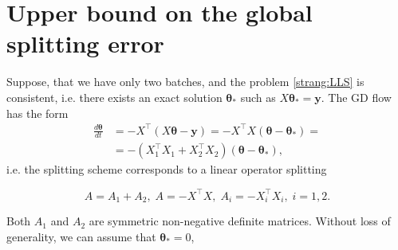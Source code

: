 \documentclass{article}
\newcommand{\vect}[1]{\boldsymbol{\mathbf{#1}}}
\begin{document}

\newpage
{ \small
}


\appendix


\section{Upper bound on the global splitting error}

Suppose, that we have only two batches, and the problem \eqref{strang:LLS} is consistent, i.e. there exists an exact solution $\vect{\theta}_*$ such as $X \vect{\theta}_* = \vect{y}$. The GD flow has the form
\begin{equation}\label{strang:model1}
\begin{split}
    \frac{d \vect{\theta}}{d t} &= -X^{\top} (X \vect{\theta} - \vect{y}) = -X^{\top} X(\vect{\theta} - \vect{\theta}_*) =\\ &= -(X_1^{\top} X_1 + X^{\top}_2 X_2)(\vect{\theta} - \vect{\theta}_*),
\end{split}
\end{equation}
i.e. the splitting scheme corresponds to a linear operator splitting

\begin{equation*}
A = A_1 + A_2, \; A = -X^{\top} X, \; A_i = -X^{\top}_i X_i, \; i = 1, 2.
\end{equation*}

Both $A_1$ and $A_2$ are symmetric non-negative definite matrices. Without loss of generality, we can assume that $\vect{\theta}_* = 0$,
\end{document}
